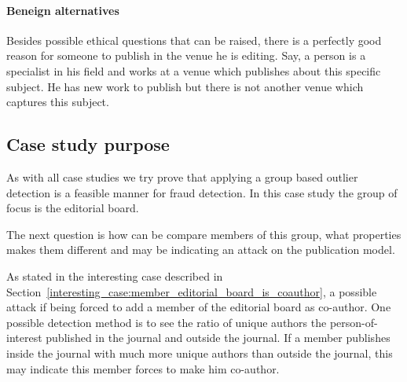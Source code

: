 \documentclass{ou-report}
\begin{document}
\paragraph{Beneign alternatives}
Besides possible ethical questions that can be raised, there is a perfectly good
reason for someone to publish in the venue he is editing. Say, a person is a 
specialist in his field and works at a venue which publishes about this 
specific subject. He has new work to publish but there is not another venue 
which captures this subject.


\subsection{Case study purpose}
\label{subsec:case2_purpose}
As with all case studies we try prove that applying a group based outlier 
detection is a feasible manner for fraud detection. In this case study the group
of focus is the editorial board.

The next question is how can be compare members of this group, what properties
makes them different and may be indicating an attack on the publication model.

As stated in the interesting case described in 
Section~\ref{interesting_case:member_editorial_board_is_coauthor}, a 
possible attack if being forced 
to add a member of the editorial board as co-author. One possible detection 
method is to see the ratio of unique authors the person-of-interest published
in the journal and outside the journal. If a member publishes inside the journal
with much more unique authors than outside the journal, this may indicate this 
member forces to make him co-author.

\end{document}
